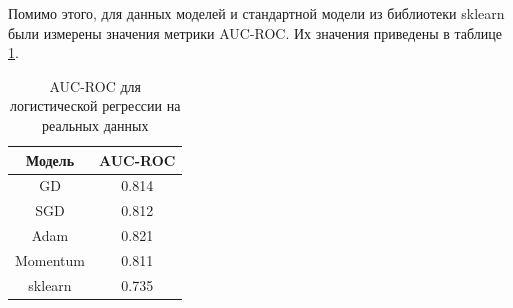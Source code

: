 \documentclass{article}
\begin{document}
Помимо этого, для данных моделей и стандартной модели из библиотеки sklearn были измерены значения метрики AUC-ROC. Их значения приведены в таблице \ref{auc_roc}.

\begin{table}[h]
    \centering
    \begin{tabular}{c|c}
        \textbf{Модель} & \textbf{AUC-ROC} \\\hline
         GD&0.814\\
         SGD&0.812\\ 
         Adam&0.821\\ 
         Momentum&0.811\\ 
         sklearn&0.735\\ 
    \end{tabular}
    \caption{AUC-ROC для логистической регрессии на реальных данных}
    \label{auc_roc}
\end{table}
\end{document}
